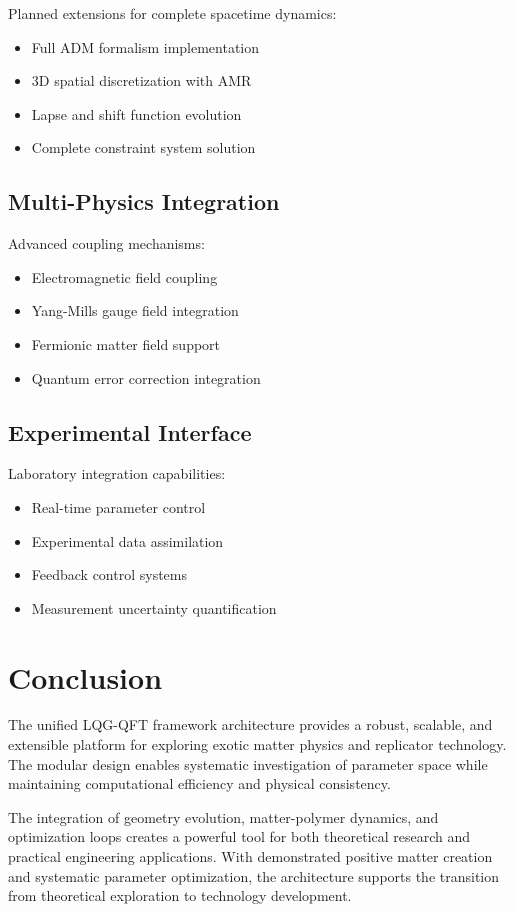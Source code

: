 \documentclass[11pt]{article}
\begin{document}
Planned extensions for complete spacetime dynamics:
\begin{itemize}
\item Full ADM formalism implementation
\item 3D spatial discretization with AMR
\item Lapse and shift function evolution
\item Complete constraint system solution
\end{itemize}

\subsection{Multi-Physics Integration}

Advanced coupling mechanisms:
\begin{itemize}
\item Electromagnetic field coupling
\item Yang-Mills gauge field integration
\item Fermionic matter field support
\item Quantum error correction integration
\end{itemize}

\subsection{Experimental Interface}

Laboratory integration capabilities:
\begin{itemize}
\item Real-time parameter control
\item Experimental data assimilation
\item Feedback control systems
\item Measurement uncertainty quantification
\end{itemize}

\section{Conclusion}

The unified LQG-QFT framework architecture provides a robust, scalable, and extensible platform for exploring exotic matter physics and replicator technology. The modular design enables systematic investigation of parameter space while maintaining computational efficiency and physical consistency.

The integration of geometry evolution, matter-polymer dynamics, and optimization loops creates a powerful tool for both theoretical research and practical engineering applications. With demonstrated positive matter creation and systematic parameter optimization, the architecture supports the transition from theoretical exploration to technology development.
\end{document}
